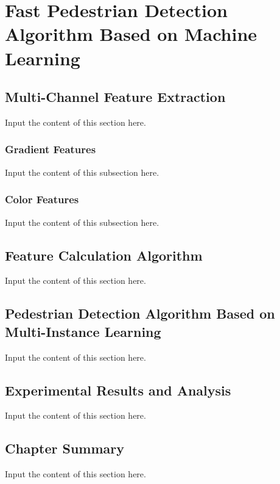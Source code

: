 \chapter{Fast Pedestrian Detection Algorithm Based on Machine Learning}

\section{Multi-Channel Feature Extraction}
Input the content of this section here.

\subsection{Gradient Features}
Input the content of this subsection here.

\subsection{Color Features}
Input the content of this subsection here.

\section{Feature Calculation Algorithm}
Input the content of this section here.

\section{Pedestrian Detection Algorithm Based on Multi-Instance Learning}
Input the content of this section here.

\section{Experimental Results and Analysis}
Input the content of this section here.

\section{Chapter Summary}
Input the content of this section here.
